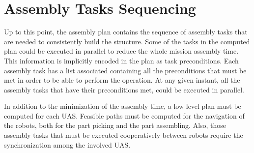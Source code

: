 \documentclass[letterpaper, 12pt, conference]{ieeeconf}    %
\begin{document}
%

\section{Assembly Tasks Sequencing}
	\label{sec:ats}

Up to this point, the assembly plan contains the sequence of assembly tasks that are needed to consistently build the structure. Some of the tasks in the computed plan could be executed in parallel to reduce the whole mission assembly time. This information is implicitly encoded in the plan as task preconditions. Each assembly task has a list associated containing all the preconditions that must be met in order to be able to perform the operation. At any given instant, all the assembly tasks that have their preconditions met, could be executed in parallel. 


In addition to the minimization of the assembly time, a low level plan must be computed for each UAS. Feasible paths must be computed for the navigation of the robots, both for the part picking and the part assembling. Also, those assembly tasks that must be executed cooperatively between robots require the synchronization among the involved UAS.
\end{document}
